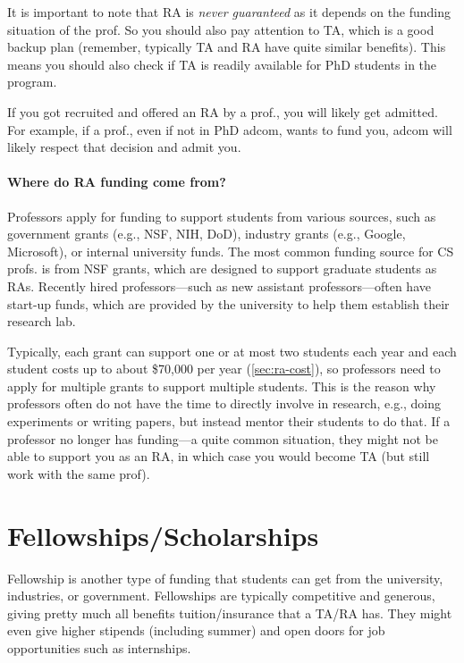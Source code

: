 \documentclass[oneside,11pt]{book}
\newenvironment{commentbox}[1][]{
  \small
  \begin{marker}[\faChessPawn{}]
    {\textbf{#1}}
  }{
  \end{marker}
}
\begin{document}
It is important to note that RA is \emph{never guaranteed} as it depends on the funding situation of the prof. So you should also pay attention to TA, which is a good backup plan (remember, typically TA and RA have quite similar benefits). This means you should also check if TA is readily available for PhD students in the program.


\begin{commentbox}
  If you got recruited and offered an RA by a prof., you will likely get admitted.  For example, if a prof., even if not in PhD adcom, wants to fund you, adcom will likely respect that decision and admit you.
\end{commentbox}


\paragraph{Where do RA funding come from?} Professors apply for funding to support students from various sources, such as government grants (e.g., NSF, NIH, DoD), industry grants (e.g., Google, Microsoft), or internal university funds.  The most common funding source for CS profs. is from NSF grants, which are designed to support graduate students as RAs.  Recently hired professors---such as new assistant professors---often have start-up funds, which are provided by the university to help them establish their research lab.  

Typically, each grant can support one or at most two students each year and each student costs up to about \$70,000 per year (\autoref{sec:ra-cost}), so professors need to apply for multiple grants to support multiple students.  This is the reason why professors often do not have the time to directly involve in research, e.g., doing experiments or writing papers, but instead mentor their students to do that. If a professor no longer has funding---a quite common situation, they might not be able to support you as an RA, in which case you would become TA (but still work with the same prof).  

\section{Fellowships/Scholarships}\label{sec:fellowships}

Fellowship is another type of funding that students can get from the university, industries, or government.
Fellowships are typically competitive and generous, giving pretty much all benefits tuition/insurance that a TA/RA has.  They might even give higher stipends (including summer) and open doors for job opportunities such as internships.
\end{document}
